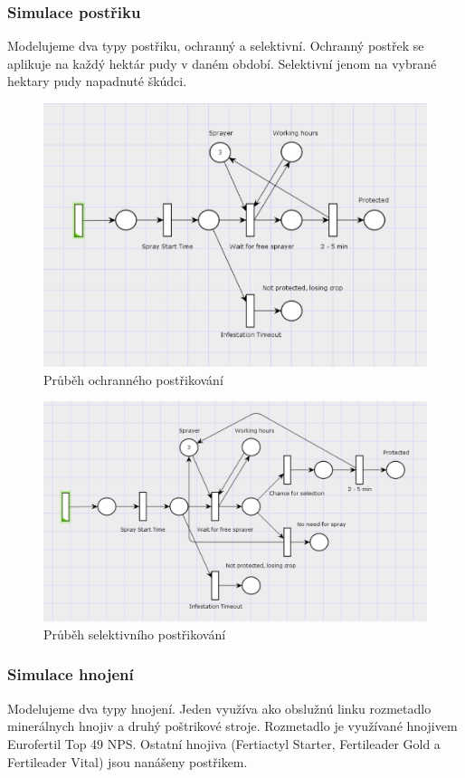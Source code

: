 \documentclass[11pt,a4paper,titlepage]{article}
\begin{document}
\subsubsection{Simulace postřiku}
Modelujeme dva typy postřiku, ochranný a selektivní. Ochranný postřek se aplikuje na každý hektár pudy v daném období. Selektivní jenom na vybrané hektary pudy napadnuté škúdci.

\begin{figure}[ht!]
\centering
\includegraphics[scale=0.3]{img/SprayProt.png}
\caption{Průběh ochranného postřikování}
\end{figure}

\begin{figure}[ht!]
\centering
\includegraphics[scale=0.3]{img/SpraySel.png}
\caption{Průběh selektivního postřikování}
\end{figure}

\pagebreak

\subsubsection{Simulace hnojení}
Modelujeme dva typy hnojení. Jeden využíva ako obslužnú linku rozmetadlo minerálnych hnojiv a druhý poštrikové stroje. Rozmetadlo je využívané hnojivem Eurofertil Top 49 NPS. Ostatní hnojiva (Fertiactyl Starter, Fertileader Gold a Fertileader Vital) jsou nanášeny postřikem.
\end{document}
